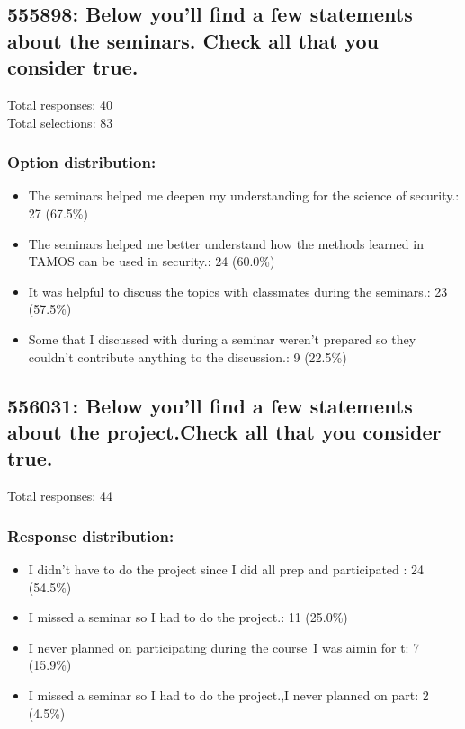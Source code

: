 \documentclass[a4paper]{report}
\begin{document}
\subsection{555898: Below you'll find a few statements about the seminars. Check all that you consider true.}

Total responses: 40\\
Total selections: 83\\

\subsubsection{Option distribution:}
\begin{itemize}
  \item The seminars helped me deepen my understanding for the science of security.: 27 (67.5\%)
  \item The seminars helped me better understand how the methods learned in TAMOS can be used in security.: 24 (60.0\%)
  \item It was helpful to discuss the topics with classmates during the seminars.: 23 (57.5\%)
  \item Some that I discussed with during a seminar weren't prepared so they couldn't contribute anything to the discussion.: 9 (22.5\%)
\end{itemize}

\subsection{556031: Below you'll find a few statements about the project.Check 
all that you consider true.}

Total responses: 44\\

\subsubsection{Response distribution:}
\begin{itemize}
  \item I didn't have to do the project since I did all prep and participated : 24 (54.5\%)
  \item I missed a seminar so I had to do the project.: 11 (25.0\%)
  \item I never planned on participating during the course\, I was aimin for t: 7 (15.9\%)
  \item I missed a seminar so I had to do the project.,I never planned on part: 2 (4.5\%)
\end{itemize}
\end{document}

